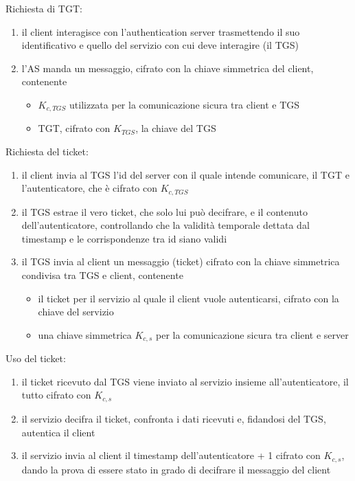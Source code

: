 \documentclass[11pt]{article}
\begin{document}
Richiesta di TGT:
\begin{enumerate}
    \item il client interagisce con l'authentication server trasmettendo il suo identificativo e quello del servizio con 
    cui deve interagire (il TGS)
    \item l'AS manda un messaggio, cifrato con la chiave simmetrica del client, contenente
    \begin{itemize}
        \item $K_{c,TGS}$ utilizzata per la comunicazione sicura tra client e TGS
        \item TGT, cifrato con $K_{TGS}$, la chiave del TGS 
    \end{itemize}
\end{enumerate}
Richiesta del ticket:
\begin{enumerate}
    \item il client invia al TGS l'id del server con il quale intende comunicare, il TGT e l'autenticatore, che è cifrato 
    con $K_{c,TGS}$
    \item il TGS estrae il vero ticket, che solo lui può decifrare, e il contenuto dell'autenticatore, controllando che 
    la validità temporale dettata dal timestamp e le corrispondenze tra id siano validi 
    \item il TGS invia al client un messaggio (ticket) cifrato con la chiave simmetrica condivisa tra TGS e client, contenente 
    \begin{itemize}
        \item il ticket per il servizio al quale il client vuole autenticarsi, cifrato con la chiave del servizio
        \item una chiave simmetrica $K_{c,s}$ per la comunicazione sicura tra client e server 
    \end{itemize} 
\end{enumerate}
Uso del ticket:
\begin{enumerate}
    \item il ticket ricevuto dal TGS viene inviato al servizio insieme all'autenticatore, il tutto cifrato con $K_{c,s}$ 
    \item il servizio decifra il ticket, confronta i dati ricevuti e, fidandosi del TGS, autentica il client 
    \item il servizio invia al client il timestamp dell'autenticatore + 1 cifrato con $K_{c,s}$, dando la prova di essere 
    stato in grado di decifrare il messaggio del client 
\end{enumerate}
\end{document}
